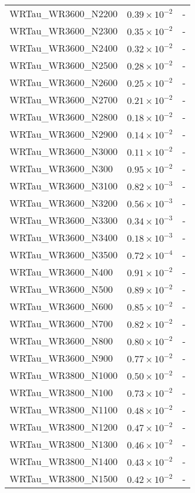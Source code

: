 \begin{longtable}[c]{| C{.35\textwidth} | C{.15\textwidth} | C{.1\textwidth}|}
    WRTau\_WR3600\_N2200 & $0.39\times10^{-2}$ & - \\
    WRTau\_WR3600\_N2300 & $0.35\times10^{-2}$ & - \\
    WRTau\_WR3600\_N2400 & $0.32\times10^{-2}$ & - \\
    WRTau\_WR3600\_N2500 & $0.28\times10^{-2}$ & - \\
    WRTau\_WR3600\_N2600 & $0.25\times10^{-2}$ & - \\
    WRTau\_WR3600\_N2700 & $0.21\times10^{-2}$ & - \\
    WRTau\_WR3600\_N2800 & $0.18\times10^{-2}$ & - \\
    WRTau\_WR3600\_N2900 & $0.14\times10^{-2}$ & - \\
    WRTau\_WR3600\_N3000 & $0.11\times10^{-2}$ & - \\
    WRTau\_WR3600\_N300 & $0.95\times10^{-2}$ & - \\
    WRTau\_WR3600\_N3100 & $0.82\times10^{-3}$ & - \\
    WRTau\_WR3600\_N3200 & $0.56\times10^{-3}$ & - \\
    WRTau\_WR3600\_N3300 & $0.34\times10^{-3}$ & - \\
    WRTau\_WR3600\_N3400 & $0.18\times10^{-3}$ & - \\
    WRTau\_WR3600\_N3500 & $0.72\times10^{-4}$ & - \\
    WRTau\_WR3600\_N400 & $0.91\times10^{-2}$ & - \\
    WRTau\_WR3600\_N500 & $0.89\times10^{-2}$ & - \\
    WRTau\_WR3600\_N600 & $0.85\times10^{-2}$ & - \\
    WRTau\_WR3600\_N700 & $0.82\times10^{-2}$ & - \\
    WRTau\_WR3600\_N800 & $0.80\times10^{-2}$ & - \\
    WRTau\_WR3600\_N900 & $0.77\times10^{-2}$ & - \\ \hline
    WRTau\_WR3800\_N1000 & $0.50\times10^{-2}$ & - \\
    WRTau\_WR3800\_N100 & $0.73\times10^{-2}$ & - \\
    WRTau\_WR3800\_N1100 & $0.48\times10^{-2}$ & - \\
    WRTau\_WR3800\_N1200 & $0.47\times10^{-2}$ & - \\
    WRTau\_WR3800\_N1300 & $0.46\times10^{-2}$ & - \\
    WRTau\_WR3800\_N1400 & $0.43\times10^{-2}$ & - \\
    WRTau\_WR3800\_N1500 & $0.42\times10^{-2}$ & - \\

\end{longtable}
